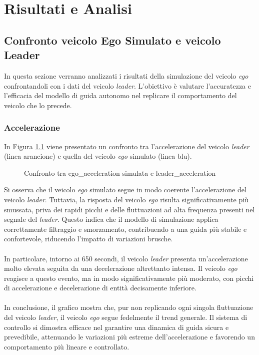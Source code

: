 \chapter{Risultati e Analisi}
\label{cha:risultati}
\section{Confronto veicolo Ego Simulato e veicolo Leader}
In questa sezione verranno analizzati i risultati della simulazione del veicolo \emph{ego} confrontandoli 
con i dati del veicolo \emph{leader}. L'obiettivo è valutare l'accuratezza e l'efficacia del modello di guida autonomo nel replicare 
il comportamento del veicolo che lo precede.
\subsection{Accelerazione}
In Figura \ref{fig:acc_leader_ego} viene presentato un confronto tra l'accelerazione del veicolo \emph{leader} 
(linea arancione) e quella del veicolo \emph{ego} simulato (linea blu).
\begin{figure}[H]
    \centering
    \caption{Confronto tra ego\_acceleration simulata e leader\_acceleration}
    \label{fig:acc_leader_ego}
\end{figure}
\noindent Si osserva che il veicolo \emph{ego} simulato segue in modo coerente l'accelerazione del veicolo \emph{leader}. Tuttavia, la 
risposta del veicolo \emph{ego} risulta significativamente più smussata, priva dei rapidi picchi e delle fluttuazioni ad alta frequenza 
presenti nel segnale del \emph{leader}. Questo indica che il modello di simulazione applica correttamente filtraggio e smorzamento, 
contribuendo a una guida più stabile e confortevole, riducendo l'impatto di variazioni brusche.
\\\\
\noindent In particolare, intorno ai 650 secondi, il veicolo \emph{leader} presenta un'accelerazione molto elevata seguita da una decelerazione 
altrettanto intensa. Il veicolo \emph{ego} reagisce a questo evento, ma in modo significativamente più moderato, con picchi di accelerazione 
e decelerazione di entità decisamente inferiore.
\\\\
\noindent In conclusione, il grafico mostra che, pur non replicando ogni singola fluttuazione del veicolo \emph{leader}, 
il veicolo \emph{ego} segue fedelmente il trend generale. Il sistema di controllo si dimostra efficace nel garantire 
una dinamica di guida sicura e prevedibile, attenuando le variazioni più estreme dell'accelerazione e favorendo 
un comportamento più lineare e controllato.

